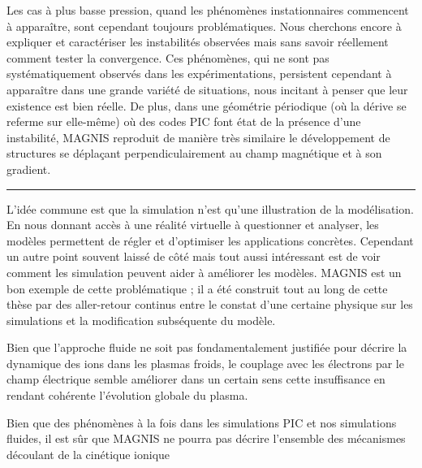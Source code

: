 Les cas à plus basse pression, quand les phénomènes instationnaires
commencent à apparaître, sont cependant toujours problématiques. Nous
cherchons encore à expliquer et caractériser les instabilités observées mais
sans savoir réellement comment tester la convergence. Ces phénomènes, qui ne
sont pas systématiquement observés dans les expérimentations, 
persistent cependant à apparaître dans une grande variété de situations, nous
incitant à penser que leur existence est bien réelle. De plus, dans une
géométrie périodique (où la dérive se referme sur elle-même) où des codes PIC
font état de la présence d'une instabilité, MAGNIS reproduit de manière très similaire 
le développement de structures se déplaçant perpendiculairement au champ
magnétique et à son gradient.

\begin{center}
\rule{0.6\textwidth}{1pt}
\end{center}

L'idée commune est que la simulation n'est qu'une illustration de la
modélisation. En nous donnant accès à une réalité virtuelle à questionner et
analyser, les modèles permettent de régler et d'optimiser les applications
concrètes. Cependant un autre point souvent laissé de côté mais tout aussi
intéressant est de voir comment les simulation peuvent aider à améliorer les
modèles. MAGNIS est un bon exemple de cette problématique ; il a été construit
tout au long de cette thèse par des aller-retour continus entre le constat d'une
certaine physique sur les simulations et la modification subséquente du modèle.


Bien que
l'approche fluide ne soit pas fondamentalement justifiée pour décrire la
dynamique des ions dans les plasmas froids, le couplage avec les électrons par
le champ électrique semble améliorer dans un certain sens cette insuffisance en
rendant cohérente l'évolution globale du plasma.

Bien que des phénomènes à la fois dans les
simulations PIC et nos simulations fluides, il est sûr que MAGNIS ne
pourra pas décrire l'ensemble des mécanismes découlant de la cinétique ionique

